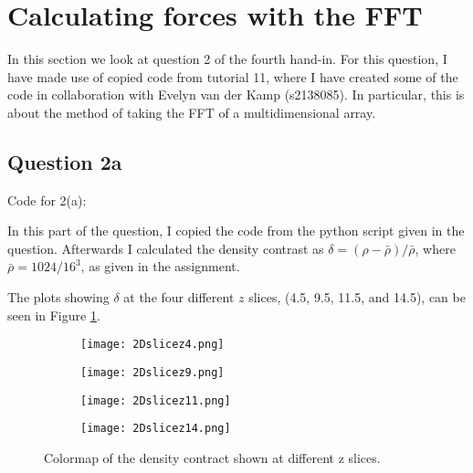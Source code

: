 \section{Calculating forces with the FFT}

In this section we look at question 2 of the fourth hand-in. 
For this question, I have made use of copied code from tutorial 11, where I have created some of the code in collaboration with Evelyn van der Kamp (s2138085). 
In particular, this is about the method of taking the FFT of a multidimensional array. 

\subsection{Question 2a}

Code for 2(a):


In this part of the question, I copied the code from the python script given in the question.
Afterwards I calculated the density contrast as $\delta = (\rho - \bar{\rho})/\bar{\rho}$, where $\bar{\rho} = 1024/16^3$, as given in the assignment.

The plots showing $\delta$ at the four different $z$ slices, (4.5, 9.5, 11.5, and 14.5), can be seen in Figure \ref{fig:2Dslicea}.

\begin{figure}[ht!]
\begin{center}
        \begin{subfigure}{.49\textwidth}
      \centering
      \texttt{[image: 2Dslicez4.png]}
    \end{subfigure}
    \vspace{-10pt}
    \begin{subfigure}{.49\textwidth}
      \centering
      \texttt{[image: 2Dslicez9.png]}
    \end{subfigure}
     \vspace{-10pt}
    \begin{subfigure}{.49\textwidth}
      \centering
      \texttt{[image: 2Dslicez11.png]}
    \end{subfigure}
     \vspace{-10pt}
    \begin{subfigure}{.49\textwidth}
      \centering
      \texttt{[image: 2Dslicez14.png]}
    \end{subfigure}
    \caption{Colormap of the density contract shown at different z slices.}
    \label{fig:2Dslicea}
\end{center}
\end{figure}

